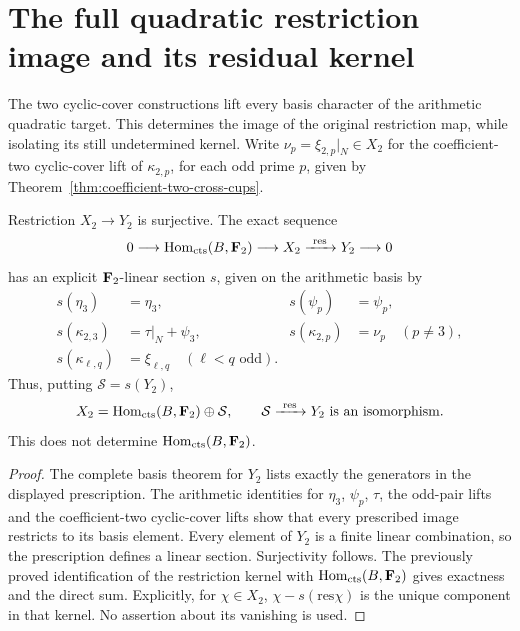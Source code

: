 \section{The full quadratic restriction image and its residual kernel}
\label{sec:complete-quadratic-restriction}

The two cyclic-cover constructions lift every basis character of the
arithmetic quadratic target. This determines the image of the original
restriction map, while isolating its still undetermined kernel.
Write \(\nu_p=\xi_{2,p}|_N\in X_2\) for the coefficient-two
cyclic-cover lift of \(\kappa_{2,p}\), for each odd prime \(p\),
given by Theorem~\ref{thm:coefficient-two-cross-cups}.

\begin{theorem}\label{thm:complete-quadratic-restriction}
Restriction \(X_2\to Y_2\) is surjective. The exact sequence
\[
 0\longrightarrow\operatorname{Hom}_{\rm cts}(B,\mathbf F_2)
 \longrightarrow X_2\xrightarrow{\ \mathrm{res}\ }Y_2
 \longrightarrow0
\]
has an explicit \(\mathbf F_2\)-linear section \(s\), given on the
arithmetic basis by
\[
 \begin{aligned}
 s(\eta_3)&=\eta_3,& s(\psi_p)&=\psi_p,\\
 s(\kappa_{2,3})&=\tau|_N+\psi_3,&
 s(\kappa_{2,p})&=\nu_p\quad(p\ne3),\\
 s(\kappa_{\ell,q})&=\xi_{\ell,q}\quad(\ell<q\text{ odd}).
 \end{aligned}
\]
Thus, putting \(\mathcal S=s(Y_2)\),
\[
 X_2=\operatorname{Hom}_{\rm cts}(B,\mathbf F_2)\oplus\mathcal S,
 \qquad \mathcal S\xrightarrow{\ \mathrm{res}\ }Y_2
                 \text{ is an isomorphism}.
\]
This does not determine \(\operatorname{Hom}_{\rm cts}(B,\mathbf F_2)\).
\end{theorem}
\begin{proof}
The complete basis theorem for \(Y_2\) lists exactly the generators
in the displayed prescription. The arithmetic identities for
\(\eta_3\), \(\psi_p\), \(\tau\), the odd-pair lifts and the
coefficient-two cyclic-cover lifts show that every prescribed image
restricts to its basis element. Every element of \(Y_2\) is a finite
linear combination, so the prescription defines a linear section.
Surjectivity follows. The previously proved identification of the
restriction kernel with \(\operatorname{Hom}_{\rm cts}(B,\mathbf F_2)\)
gives exactness and the direct sum. Explicitly, for \(\chi\in X_2\),
\(\chi-s(\mathrm{res}\chi)\) is the unique component in that kernel.
No assertion about its vanishing is used.
\end{proof}

